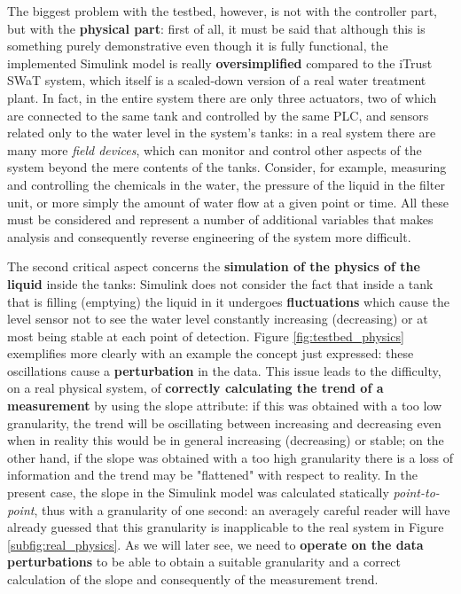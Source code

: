 \bigskip
The biggest problem with the testbed, however, is not with the controller part, but with the \textbf{physical part}: first of all, it must be said that although this is something purely demonstrative even though it is fully functional, the implemented Simulink model is really \textbf{oversimplified} compared to the iTrust SWaT system, which itself is a scaled-down version of a real water treatment plant. In fact, in the entire system there are only three actuators, two of which are connected to the same tank and controlled by the same PLC, and sensors related only to the water level in the system's tanks: in a real system there are many more \textit{field devices}, which can monitor and control other aspects of the system beyond the mere contents of the tanks. Consider, for example, measuring and controlling the chemicals in the water, the pressure of the liquid in the filter unit, or more simply the amount of water flow at a given point or time.\newline
All these must be considered and represent a number of additional variables that makes analysis and consequently reverse engineering of the system more difficult.

\bigskip
The second critical aspect concerns the \textbf{simulation of the physics of the liquid} inside the tanks: Simulink does not consider the fact that inside a tank that is filling (emptying) the liquid in it undergoes \textbf{fluctuations} which cause the level sensor not to see the water level constantly increasing (decreasing) or at most being stable at each point of detection. Figure \ref{fig:testbed_physics} exemplifies more clearly with an example the concept just expressed: these oscillations cause a \textbf{perturbation} in the data.\newline
This issue leads to the difficulty, on a real physical system, of \textbf{correctly calculating the trend of a measurement} by using the slope attribute: if this was obtained with a too low granularity, the trend will be oscillating between increasing and decreasing even when in reality this would be in general increasing (decreasing) or stable; on the other hand, if the slope was obtained with a too high granularity there is a loss of information and the trend may be "flattened" with respect to reality.\newline
In the present case, the slope in the Simulink model was calculated statically \textit{point-to-point}, thus with a granularity of one second: an averagely careful reader will have already guessed that this granularity is inapplicable to the real system in Figure \ref{subfig:real_physics}. As we will later see, we need to \textbf{operate on the data perturbations} to be able to obtain a suitable granularity and a correct calculation of the slope and consequently of the measurement trend.
\vfill

